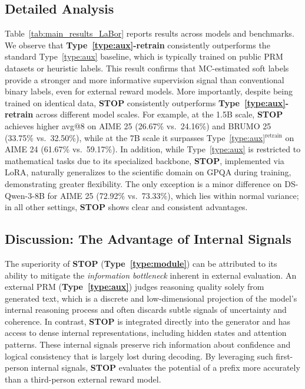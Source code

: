 \documentclass[11pt]{article}
\theoremstyle{plain}
\begin{document}
\subsection{Detailed Analysis}
Table~\ref{tab:main_results_LaBor} reports results across models and benchmarks. We observe that \textbf{Type~\ref{type:aux}-retrain} consistently outperforms the standard Type~\ref{type:aux} baseline, which is typically trained on public PRM datasets or heuristic labels. This result confirms that MC-estimated soft labels provide a stronger and more informative supervision signal than conventional binary labels, even for external reward models. More importantly, despite being trained on identical data, \textbf{STOP} consistently outperforms \textbf{Type~\ref{type:aux}-retrain} across different model scales. For example, at the 1.5B scale, \textbf{STOP} achieves higher avg@8 on AIME 25 (26.67\% vs.\ 24.16\%) and BRUMO 25 (33.75\% vs.\ 32.50\%), while at the 7B scale it surpasses Type~\ref{type:aux}${}^{\text{retrain}}$ on AIME 24 (61.67\% vs.\ 59.17\%). In addition, while Type~\ref{type:aux} is restricted to mathematical tasks due to its specialized backbone, \textbf{STOP}, implemented via LoRA, naturally generalizes to the scientific domain on GPQA during training, demonstrating greater flexibility. The only exception is a minor difference on DS-Qwen-3-8B for AIME 25 (72.92\% vs.\ 73.33\%), which lies within normal variance; in all other settings, \textbf{STOP} shows clear and consistent advantages.

\subsection{Discussion: The Advantage of Internal Signals}
The superiority of \textbf{STOP} (\textbf{Type~\ref{type:module}}) can be attributed to its ability to mitigate the \emph{information bottleneck} inherent in external evaluation. An external PRM (\textbf{Type~\ref{type:aux}}) judges reasoning quality solely from generated text, which is a discrete and low-dimensional projection of the model’s internal reasoning process and often discards subtle signals of uncertainty and coherence. In contrast, \textbf{STOP} is integrated directly into the generator and has access to dense internal representations, including hidden states and attention patterns. These internal signals preserve rich information about confidence and logical consistency that is largely lost during decoding. By leveraging such first-person internal signals, \textbf{STOP} evaluates the potential of a prefix more accurately than a third-person external reward model.
\end{document}
